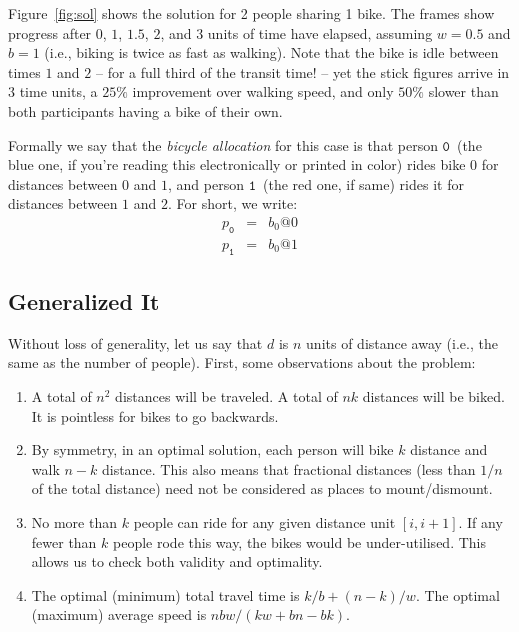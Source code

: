 \documentclass[DIV=calc, paper=a4, fontsize=11pt, twocolumn]{scrartcl}	 %
\newcommand{\initial}[1]{ %
\lettrine[lines=3,lhang=0.3,nindent=0em]{
\color{DarkGoldenrod}
{\textsf{#1}}}{}}
\begin{document}
\initial{F}igure~\ref{fig:sol} shows the solution for 2 people sharing 1 bike.
The frames show progress after $0$, $1$, $1.5$, $2$, and $3$ units of time have elapsed, assuming $w=0.5$ and $b=1$ (i.e., biking is twice as fast as walking).
Note that the bike is idle between times $1$ and $2$ -- for a full third of the transit time! -- yet the stick figures arrive in $3$ time units, a $25\%$ improvement over walking speed, and only $50\%$ slower than both participants having a bike of their own.

\newcommand\PA{\ensuremath{\mathtt{0}}}
\newcommand\PB{\ensuremath{\mathtt{1}}}
\newcommand\PC{\ensuremath{\mathtt{2}}}
\newcommand\PD{\ensuremath{\mathtt{3}}}
\newcommand\PE{\ensuremath{\mathtt{4}}}
\newcommand\distance[1]{\ensuremath{\mathsf{#1}}}
Formally we say that the {\em bicycle allocation} for this case is that person \PA~(the blue one, if you're reading this electronically or printed in color) rides bike $0$ for distances between $0$ and $1$, and person \PB~(the red one, if same) rides it for distances between $1$ and $2$. For short, we write:
\begin{eqnarray*}
	p_\PA &=& b_0@0 \\
	p_\PB &=& b_0@1
\end{eqnarray*}

\subsection{Generalized It}

\initial{W}ithout loss of generality, let us say that $d$ is $n$ units of distance away (i.e., the same as the number of people).
First, some observations about the problem:
\begin{enumerate}
	\setlength{\itemsep}{-0.5em}
	\item A total of $n^2$ distances will be traveled. A total of $nk$ distances will be biked. It is pointless for bikes to go backwards.
	\item By symmetry, in an optimal solution, each person will bike $k$ distance and walk $n-k$ distance. This also means that fractional distances (less than $1/n$ of the total distance) need not be considered as places to mount/dismount.
	\item No more than $k$ people can ride for any given distance unit $[i,i+1]$. If any fewer than $k$ people rode this way, the bikes would be under-utilised. This allows us to check both validity and optimality.
	\item The optimal (minimum) total travel time is $k/b + (n-k)/w$. The optimal (maximum) average speed is $nbw/(kw+bn-bk)$.
\end{enumerate}
\end{document}
